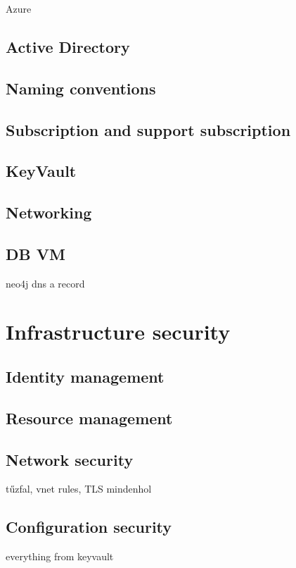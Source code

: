 Azure
\subsection{Active Directory}
\subsection{Naming conventions}
\subsection{Subscription and support subscription}
\subsection{KeyVault}
\subsection{Networking}
\subsection{DB VM}

neo4j dns a record

\section{Infrastructure security}
\subsection{Identity management}
\subsection{Resource management}
\subsection{Network security}
tűzfal, vnet rules, TLS mindenhol

\subsection{Configuration security}
everything from keyvault
